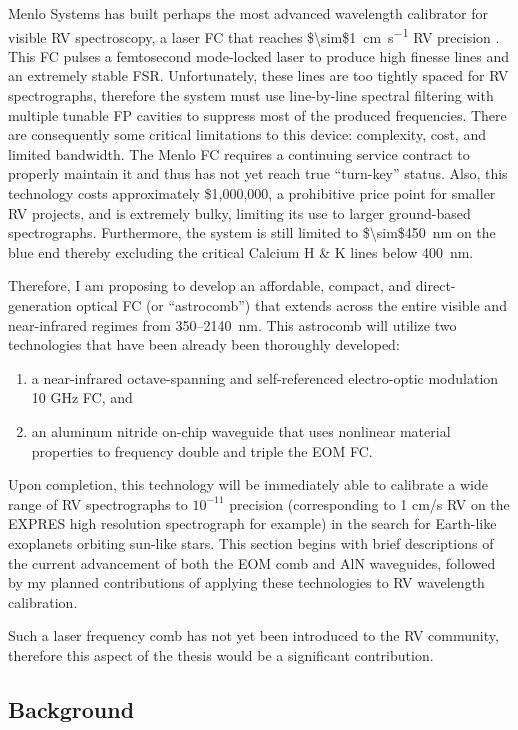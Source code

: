 \documentclass[11pt]{article}
\begin{document}
Menlo Systems has built perhaps the most advanced wavelength calibrator for visible RV spectroscopy, a laser FC that reaches \SI{$\sim$1}{\centi\meter\per\second} RV precision \cite{Probst2014}. This FC pulses a femtosecond mode-locked laser to produce high finesse lines and an extremely stable FSR. Unfortunately, these lines are too tightly spaced for RV spectrographs, therefore the system must use line-by-line spectral filtering with multiple tunable FP cavities to suppress most of the produced frequencies. There are consequently some critical limitations to this device: complexity, cost, and limited bandwidth. The Menlo FC requires a continuing service contract to properly maintain it and thus has not yet reach true ``turn-key'' status. Also, this technology costs approximately \$1,000,000, a prohibitive price point for smaller RV projects, and is extremely bulky, limiting its use to larger ground-based spectrographs. Furthermore, the system is still limited to \SI{$\sim$450}{\nano\meter} on the blue end thereby excluding the critical Calcium H \& K lines below \SI{400}{\nano\meter}.

Therefore, I am proposing to develop an affordable, compact, and direct-generation optical FC (or ``astrocomb'') that extends across the entire visible and near-infrared regimes from \SI{350–2140}{\nano\meter}. This astrocomb will utilize two technologies that have been already been thoroughly developed:
\begin{enumerate}
    \item a near-infrared octave-spanning and self-referenced electro-optic modulation 10 GHz FC, and
    \item an aluminum nitride on-chip waveguide that uses nonlinear material properties to frequency double and triple the EOM FC.
\end{enumerate}
Upon completion, this technology will be immediately able to calibrate a wide range of RV spectrographs to $10^{-11}$ precision (corresponding to 1 cm/s RV on the EXPRES high resolution spectrograph for example) in the search for Earth-like exoplanets orbiting sun-like stars. This section begins with brief descriptions of the current advancement of both the EOM comb and AlN waveguides, followed by my planned contributions of applying these technologies to RV wavelength calibration.

Such a laser frequency comb has not yet been introduced to the RV community, therefore this aspect of the thesis would be a significant contribution.


\subsection{Background}
\end{document}
